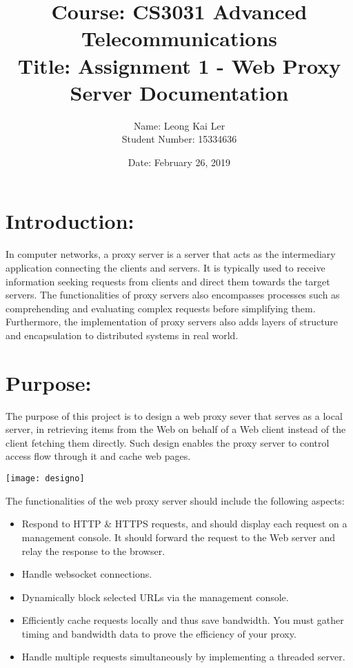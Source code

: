 \documentclass[12pt]{article}%
\makeatletter
\renewcommand{\maketitle}{\bgroup\setlength{\parindent}{0pt}
\begin{flushleft}
  \textbf{\@title}

  \@author
  \@date
\end{flushleft}\egroup
}
\makeatother
\begin{document}
\title{\large Course: CS3031 Advanced Telecommunications \\ \normalsize Title: Assignment 1 - Web Proxy Server Documentation}
\author{Name: Leong Kai Ler \\ Student Number: 15334636 \\   }
\date{Date: February 26, 2019}
\maketitle

\section*{Introduction:}
In computer networks, a proxy server is a server that acts as the intermediary application connecting the clients and servers. It is typically used to receive information seeking requests from clients and direct them towards the target servers. The functionalities of proxy servers also encompasses processes such as comprehending and evaluating complex requests before simplifying them. Furthermore, the implementation of proxy servers also adds layers of structure and encapsulation to distributed systems in real world. \\

\section*{Purpose:}
The purpose of this project is to design a web proxy sever that serves as a local server, in retrieving items from the Web on behalf of a Web client instead of the client fetching them directly. Such design enables the proxy server to control access flow through it and cache web pages. \\
\begin{center}
\texttt{[image: designo]}
\end{center}
\newpage
The functionalities of the web proxy server should include the following aspects:
\begin{itemize}
\item Respond to HTTP \& HTTPS requests, and should display each request on a management console. It should forward the request to the Web server and relay the response to the
browser. 
\item Handle websocket connections.
\item Dynamically block selected URLs via the management console.
\item Efficiently cache requests locally and thus save bandwidth. You must gather timing and bandwidth data to prove the efficiency of your proxy. 
\item Handle multiple requests simultaneously by implementing a threaded server.
\end{itemize}
\newpage
\end{document}
